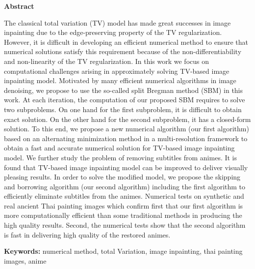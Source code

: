 \thispagestyle{empty}
\vspace{2 cm}
{\huge \bf Abstract}

\vspace{2 cm}

\hspace{1cm} The classical total variation (TV) model has made great successes in image inpainting due to the edge-preserving property of the TV regularization. However, it is difficult in developing an efficient numerical method to ensure that numerical solutions satisfy this requirement because of the non-differentiability and non-linearity of the TV regularization. In this work we focus on computational challenges arising in approximately solving TV-based image inpainting model. Motivated by many efficient numerical algorithms in image denoising, we propose to use the so-called split Bregman method (SBM) in this work. At each iteration, the computation of our proposed SBM requires to solve two subproblems. On one hand for the first subproblem, it is difficult to obtain exact solution. On the other hand for the second subproblem, it has a closed-form solution. To this end, we propose a new numerical algorithm (our first algorithm) based on an alternating minimization method in a multi-resolution framework to obtain a fast and accurate numerical solution for TV-based image inpainting model. We further study the problem of removing subtitles from animes. It is found that TV-based image inpainting model can be improved to deliver visually pleasing results. In order to solve the modified model, we propose the skipping and borrowing algorithm (our second algorithm) including the first algorithm to efficiently eliminate subtitles from the animes. Numerical tests on synthetic and real ancient Thai painting images which confirm first that our first algorithm is more computationally efficient than some traditional methods in producing the high quality results. Second, the numerical tests show that the second algorithm is fast in delivering high quality of the restored animes.   

\vspace{1 cm}

{\bf{Keywords:}} numerical method, total Variation, image inpainting, thai painting images, anime \\
\newpage